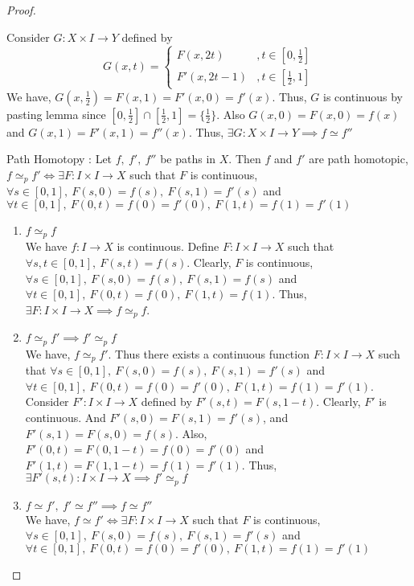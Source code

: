 \begin{proof}
\begin{enumerate}
			Consider $G:X \times I \to Y$ defined by \[ G(x,t) = \begin{cases} F(x,2t) & , t \in [0,\frac{1}{2}]\\ F'(x,2t-1) & , t \in [\frac{1}{2},1] \end{cases} \] We have, $G(x,\frac{1}{2}) = F(x,1) = F'(x,0) = f'(x)$.
				Thus, $G$ is continuous by pasting lemma since $[0,\frac{1}{2}] \cap [\frac{1}{2},1] = \{ \frac{1}{2}\}$.
				Also $G(x,0) = F(x,0) = f(x)$ and $G(x,1) = F'(x,1) = f''(x)$.
				Thus, $\exists G : X \times I \to Y \implies f \simeq f''$
	\end{enumerate}
	Path Homotopy : Let $f,\ f',\ f''$ be paths in $X$.
	Then $f$ and $f'$ are path homotopic, $f \simeq_p f' \iff \exists F : I \times I \to X$ such that $F$ is continuous, $\forall s \in [0,1],\ F(s,0)=f(s),\ F(s,1)=f'(s)$ and $\forall t \in [0,1],\ F(0,t)=f(0)=f'(0),\ F(1,t)=f(1)=f'(1)$
	\begin{enumerate}
		\item $f \simeq_p f$ \\
			We have $f : I \to X$ is continuous.
			Define $F : I \times I \to X$ such that $\forall s,t \in [0,1],\ F(s,t)=f(s)$.
			Clearly, $F$ is continuous, $\forall s \in [0,1],\ F(s,0) = f(s),\ F(s,1) = f(s)$ and $\forall t \in [0,1],\ F(0,t) = f(0),\ F(1,t) = f(1)$.
			Thus, $\exists F : I \times I \to X \implies f \simeq_p f$.
		\item $f \simeq_p f' \implies f' \simeq_p f$\\
			We have, $f \simeq_p f'$.
			Thus there exists a continuous function $F : I \times I \to X$ such that $\forall s \in [0,1],\ F(s,0) = f(s),\ F(s,1) = f'(s)$ and $\forall t \in [0,1],\ F(0,t)=f(0)=f'(0),\ F(1,t) = f(1) = f'(1)$.\\
			
			Consider $F' : I \times I \to X$ defined by $F'(s,t) = F(s,1-t)$.
			Clearly, $F'$ is continuous.
			And $F'(s,0) = F(s,1) = f'(s)$, and $F'(s,1) = F(s,0) = f(s)$.
			Also, $F'(0,t) = F(0,1-t) = f(0) = f'(0)$ and $F'(1,t) = F(1,1-t) = f(1) = f'(1)$.
			Thus, $\exists F'(s,t) : I \times I \to X \implies f' \simeq_p f$
		\item $f \simeq f',\ f' \simeq f'' \implies f \simeq f''$\\
			We have, $f \simeq f' \iff \exists F : I \times I \to X$ such that $F$ is continuous, $\forall s \in [0,1],\ F(s,0)=f(s),\ F(s,1)=f'(s)$ and $\forall t \in [0,1],\ F(0,t)=f(0)=f'(0),\ F(1,t)=f(1)=f'(1)$\\
			

\end{enumerate}
\end{proof}
